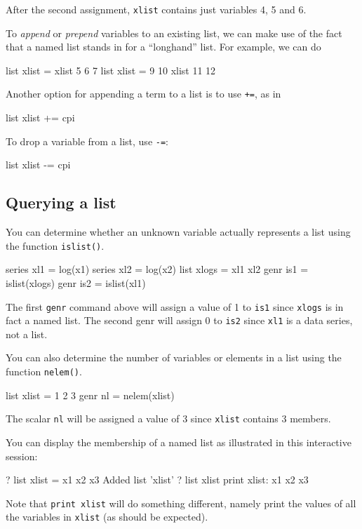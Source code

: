 After the second assignment, \texttt{xlist} contains just variables 4,
5 and 6.

To \textit{append} or \textit{prepend} variables to an existing list,
we can make use of the fact that a named list stands in for a
``longhand'' list.  For example, we can do
%
\begin{code}
list xlist = xlist 5 6 7
list xlist = 9 10 xlist 11 12
\end{code}
%
Another option for appending a term to a list is to use \texttt{+=},
as in
%
\begin{code}
list xlist += cpi
\end{code}
%
To drop a variable from a list, use \texttt{-=}:
%
\begin{code}
list xlist -= cpi
\end{code}
%

\subsection{Querying a list}

You can determine whether an unknown variable actually represents a list
using the function \texttt{islist()}.
%
\begin{code}
series xl1 = log(x1)
series xl2 = log(x2)
list xlogs = xl1 xl2
genr is1 = islist(xlogs)
genr is2 = islist(xl1)
\end{code}

The first \texttt{genr} command above will assign a value of 1 to
\texttt{is1} since \texttt{xlogs} is in fact a named list.  The second
genr will assign 0 to \texttt{is2} since \texttt{xl1} is a data
series, not a list.  

You can also determine the number of variables or elements in a list
using the function \texttt{nelem()}.
%
\begin{code}
list xlist = 1 2 3
genr nl = nelem(xlist)
\end{code}

The scalar \texttt{nl} will be assigned a value of 3 since
\texttt{xlist} contains 3 members.

You can display the membership of a named list as illustrated in this
interactive session:
%
\begin{code}
? list xlist = x1 x2 x3
Added list 'xlist'
? list xlist print
 xlist: x1 x2 x3
\end{code}
%
Note that \texttt{print xlist} will do something different, namely
print the values of all the variables in \texttt{xlist} (as should be
expected).

